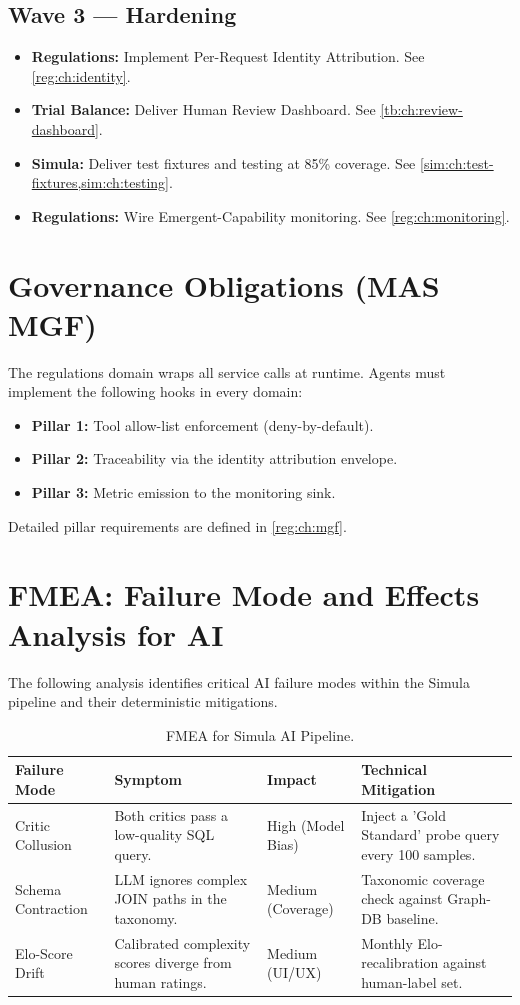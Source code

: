 \documentclass[12pt,a4paper,twoside]{report}
\begin{document}
\subsection*{Wave 3 --- Hardening}
\begin{itemize}
\item \textbf{Regulations:} Implement Per-Request Identity Attribution. See \cref{reg:ch:identity}.
\item \textbf{Trial Balance:} Deliver Human Review Dashboard. See \cref{tb:ch:review-dashboard}.
\item \textbf{Simula:} Deliver test fixtures and testing at 85\% coverage. See \cref{sim:ch:test-fixtures,sim:ch:testing}.
\item \textbf{Regulations:} Wire Emergent-Capability monitoring. See \cref{reg:ch:monitoring}.
\end{itemize}

\section{Governance Obligations (MAS MGF)}
The regulations domain wraps all service calls at runtime. Agents must implement the following hooks in every domain:
\begin{itemize}
\item \textbf{Pillar 1:} Tool allow-list enforcement (deny-by-default).
\item \textbf{Pillar 2:} Traceability via the identity attribution envelope.
\item \textbf{Pillar 3:} Metric emission to the monitoring sink.
\end{itemize}
Detailed pillar requirements are defined in \cref{reg:ch:mgf}.

\section{FMEA: Failure Mode and Effects Analysis for AI}
\label{sec:fmea-ai}

The following analysis identifies critical AI failure modes within the Simula pipeline and their deterministic mitigations.

\begin{table}[htbp]
\centering
\footnotesize
\caption{FMEA for Simula AI Pipeline.}
\label{tab:simula-fmea}
\begin{tabularx}{\textwidth}{@{}l X X X@{}}
\toprule
\textbf{Failure Mode} & \textbf{Symptom} & \textbf{Impact} & \textbf{Technical Mitigation} \\
\midrule
Critic Collusion & Both critics pass a low-quality SQL query. & High (Model Bias) & Inject a 'Gold Standard' probe query every 100 samples. \\
Schema Contraction & LLM ignores complex JOIN paths in the taxonomy. & Medium (Coverage) & Taxonomic coverage check against Graph-DB baseline. \\
Elo-Score Drift & Calibrated complexity scores diverge from human ratings. & Medium (UI/UX) & Monthly Elo-recalibration against human-label set. \\
\bottomrule
\end{tabularx}
\end{table}
\end{document}
